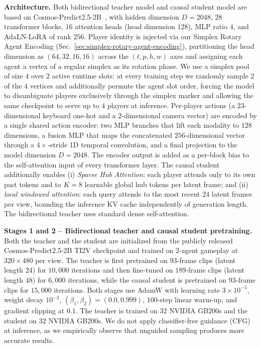 \documentclass{llmxive}
\begin{document}
\noindent\textbf{Architecture.}
Both bidirectional teacher model and causal student model are based on Cosmos-Predict2.5-2B~\cite{ali2025world-simulation},  with hidden dimension $D=2048$, $28$ transformer blocks, $16$ attention heads (head dimension $128$), MLP ratio $4$, and AdaLN-LoRA of rank $256$. Player identity is injected via our Simplex Rotary Agent Encoding (Sec.~\ref{sec:simplex-rotary-agent-encoding}), partitioning the head dimension as $(64, 32, 16, 16)$ across the $(t, p, h, w)$ axes and assigning each agent a vertex of a regular simplex as its rotation phase. We use a simplex pool of size $4$ over $2$ active runtime slots: at every training step we randomly sample $2$ of the $4$ vertices and additionally permute the agent slot order, forcing the model to disambiguate players exclusively through the simplex marker and allowing the same checkpoint to serve up to $4$ players at inference. Per-player actions (a $23$-dimensional keyboard one-hot and a $2$-dimensional camera vector) are encoded by a single shared action encoder: two MLP branches that lift each modality to $128$ dimensions, a fusion MLP that maps the concatenated $256$-dimensional vector through a $4\times$-stride 1D temporal convolution, and a final projection to the model dimension $D=2048$. The encoder output is added as a per-block bias to the self-attention input of every transformer layer. The causal student additionally enables (i) \emph{Sparse Hub Attention}: each player attends only to its own past tokens and to $K=8$ learnable global hub tokens per latent frame; and (ii) \emph{local windowed attention}: each query attends to the most recent $24$ latent frames per view, bounding the inference KV cache independently of generation length. The bidirectional teacher uses standard dense self-attention.

\noindent\textbf{Stages 1 and 2 -- Bidirectional teacher and causal student pretraining.}
Both the teacher and the student are initialized from the publicly released Cosmos-Predict2.5-2B TI2V checkpoint and trained on 2-agent gameplay at $320 \times 480$ per view. The teacher is first pretrained on $93$-frame clips (latent length $24$) for $10{,}000$ iterations and then fine-tuned on $189$-frame clips (latent length $48$) for $6{,}000$ iterations, while the causal student is pretrained on $93$-frame clips for $15{,}000$ iterations. Both stages use AdamW with learning rate $3{\times}10^{-5}$, weight decay $10^{-3}$, $(\beta_1, \beta_2) = (0.0, 0.999)$, $100$-step linear warm-up, and gradient clipping at $0.1$. The teacher is trained on $32$ NVIDIA GB200s and the student on $32$ NVIDIA GB200s. We do not apply classifier-free guidance (CFG) at inference, as we empirically observe that unguided sampling produces more accurate results.
\end{document}
